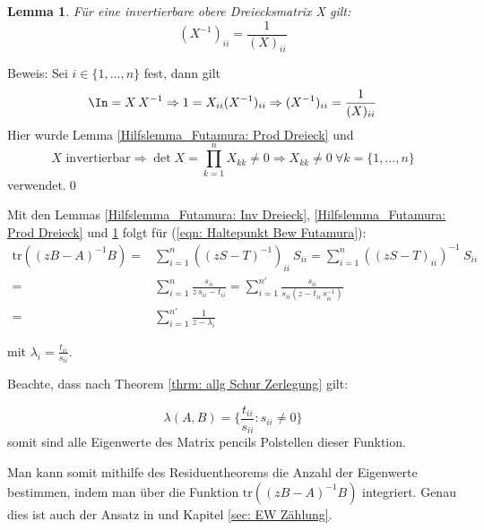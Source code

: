 \documentclass[a4paper,12pt]{report}
\newcommand{\tr}{\text{tr}}
\newcommand{\inv}{^{-1}}
\theoremstyle{plain} %
\newtheorem{lemma}[theorem]{Lemma}  %
\theoremstyle{definition} %
\theoremstyle{remark}
\begin{document}
            \begin{lemma}
                  \label{Hilfslemma_Futamura: Diag Inv Dreieck}
                  Für eine invertierbare obere Dreiecksmatrix X gilt:
                  $$(X\inv)_{ii} = \frac 1 {(X)_{ii}}$$
            \end{lemma}
            Beweis: Sei $i\in\{1,...,n\}$ fest, dann gilt
            $$\In = X\,X\inv \Rightarrow 1 = X_{ii}(X\inv)_{ii} \Rightarrow (X\inv)_{ii} = \frac 1 {(X)_{ii}}$$
            Hier wurde Lemma \ref{Hilfslemma_Futamura: Prod Dreieck} und
            $$X \text{ invertierbar}\Rightarrow \det X = \prod_{k=1}^{n}X_{kk}\ne 0\Rightarrow X_{kk}\ne 0\ \forall k=\{1,...,n\}$$
            verwendet.\qed

            Mit den Lemmas \ref{Hilfslemma_Futamura: Inv Dreieck}, \ref{Hilfslemma_Futamura: Prod Dreieck} und \ref{Hilfslemma_Futamura: Diag Inv Dreieck} folgt für (\ref{eqn: Haltepunkt Bew Futamura}):
            \begin{align*}
                  \tr((zB-A)\inv B) =& \sum_{i=1}^{n}((zS-T)\inv)_{ii}\ S_{ii} = \sum_{i=1}^{n}((zS-T)_{ii})\inv\ S_{ii}\\
                  =& \sum_{i=1}^{n}\frac{s_{ii}}{z\,s_{ii}-t_{ii}} = \sum_{i=1}^{n'}\frac{s_{ii}}{s_{ii}(z-t_{ii}\, s_{ii}\inv)}\\
                  =& \sum_{i=1}^{n'} \frac{1}{z-\lambda_i}
            \end{align*}

            mit $\lambda_i = \frac{t_{ii}}{s_{ii}}$.


            Beachte, dass nach Theorem \ref{thrm: allg Schur Zerlegung} gilt:

            $$\lambda(A, B) = \{\frac{t_{ii}}{s_{ii}} : s_{ii}\ne 0\}$$
            somit sind alle Eigenwerte des Matrix pencils Polstellen dieser Funktion.

            Man kann somit mithilfe des Residuentheorems die Anzahl der Eigenwerte bestimmen, indem man über die Funktion $\tr((zB-A)\inv B)$ integriert.
            Genau dies ist auch der Ansatz in \cite{grundlageFutamura,hauptteilTkachuk} und Kapitel \ref{sec: EW Zählung}.

            
\end{document}
